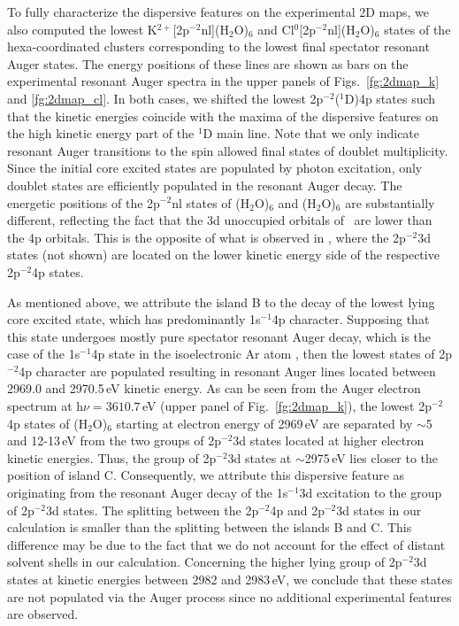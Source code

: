 To fully characterize the dispersive features on the experimental 2D maps, we also computed the lowest K$^{2+}$[2p$^{-2}$nl](H$_2$O)$_6$ and Cl$^{0}$[2p$^{-2}$nl](H$_2$O)$_6$ states of the hexa-coordinated clusters corresponding to the lowest final spectator resonant Auger states. The energy positions of these lines are shown as bars on the experimental resonant Auger spectra in the upper panels of Figs.\ \ref{fg:2dmap_k} and \ref{fg:2dmap_cl}. In both cases, we shifted the lowest 2p$^{-2}$($^1$D)4p states such that the kinetic energies coincide with the maxima of the dispersive features on the high kinetic energy part of the $^1$D main line. Note that we only indicate resonant Auger transitions to the spin allowed final states of doublet multiplicity. Since the initial core excited states are populated by photon excitation, only doublet states are efficiently populated in the resonant Auger decay. The energetic positions of the 2p$^{-2}$nl states of \ki(H$_2$O)$_6$ and \cli(H$_2$O)$_6$ are substantially different, reflecting the fact that the 3d unoccupied orbitals of \ki~are lower than the 4p orbitals. This is the opposite of what is observed in \cli, where the 2p$^{-2}$3d states (not shown) are located on the lower kinetic energy side of the respective 2p$^{-2}$4p states.


As mentioned above, we attribute the island B to the decay of the lowest lying core excited state, which has predominantly 1s$^{-1}$4p character. Supposing that this state undergoes mostly pure spectator resonant Auger decay, which is the case of the 1s$^{-1}$4p state in the isoelectronic Ar atom \citep{ceolin15:022502}, then the lowest states of 2p$^{-2}$4p character are populated resulting in resonant Auger lines located between 2969.0 and 2970.5\,eV kinetic energy. As can be seen from the Auger electron spectrum at h$\nu = 3610.7$\,eV (upper panel of Fig.\ \ref{fg:2dmap_k}), the lowest 2p$^{-2}$4p states of \ki(H$_2$O)$_6$ starting at electron energy of 2969\,eV are separated by $\sim$5 and 12-13\,eV from the two groups of 2p$^{-2}$3d states located at higher electron kinetic energies. Thus, the group of 2p$^{-2}$3d states at $\sim$2975\,eV lies closer to the position of island C. Consequently, we attribute this dispersive feature as originating from the resonant Auger decay of the 1s$^{-1}$3d excitation to the group of 2p$^{-2}$3d states. The splitting between the 2p$^{-2}$4p and 2p$^{-2}$3d states in our calculation is smaller than the splitting between the islands B and C. This difference may be due to the fact that we do not account for the effect of distant solvent shells in our calculation. Concerning the higher lying group of 2p$^{-2}$3d states at kinetic energies between 2982 and 2983\,eV, we conclude that these states are not populated via the Auger process since no additional experimental features are observed.


